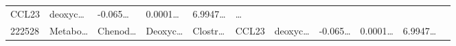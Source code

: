 \documentclass[
]{article}
\begin{document}
\begin{longtable}[]{@{}lllllllllll@{}}
\begin{minipage}[t]{0.07\columnwidth}
CCL23\strut
\end{minipage} & \begin{minipage}[t]{0.09\columnwidth}\raggedright
deoxyc\ldots{}\strut
\end{minipage} & \begin{minipage}[t]{0.07\columnwidth}\raggedright
-0.065\ldots{}\strut
\end{minipage} & \begin{minipage}[t]{0.07\columnwidth}\raggedright
0.0001\ldots{}\strut
\end{minipage} & \begin{minipage}[t]{0.07\columnwidth}\raggedright
6.9947\ldots{}\strut
\end{minipage} & \begin{minipage}[t]{0.03\columnwidth}\raggedright
\ldots{}\strut
\end{minipage}\tabularnewline
\begin{minipage}[t]{0.05\columnwidth}\raggedright
222528\strut
\end{minipage} & \begin{minipage}[t]{0.07\columnwidth}\raggedright
Metabo\ldots{}\strut
\end{minipage} & \begin{minipage}[t]{0.07\columnwidth}\raggedright
Chenod\ldots{}\strut
\end{minipage} & \begin{minipage}[t]{0.09\columnwidth}\raggedright
Deoxyc\ldots{}\strut
\end{minipage} & \begin{minipage}[t]{0.07\columnwidth}\raggedright
Clostr\ldots{}\strut
\end{minipage} & \begin{minipage}[t]{0.07\columnwidth}\raggedright
CCL23\strut
\end{minipage} & \begin{minipage}[t]{0.09\columnwidth}\raggedright
deoxyc\ldots{}\strut
\end{minipage} & \begin{minipage}[t]{0.07\columnwidth}\raggedright
-0.065\ldots{}\strut
\end{minipage} & \begin{minipage}[t]{0.07\columnwidth}\raggedright
0.0001\ldots{}\strut
\end{minipage} & \begin{minipage}[t]{0.07\columnwidth}\raggedright
6.9947\ldots{}\strut
\end{minipage} & \begin{minipage}[t]{0.03\columnwidth}\raggedright

\end{minipage}
\end{longtable}
\end{document}
